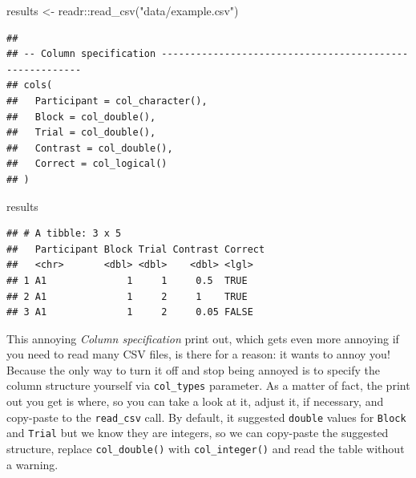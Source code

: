 \documentclass[
]{book}
\newenvironment{Shaded}{\begin{snugshade}}{\end{snugshade}}
\newcommand{\FunctionTok}[1]{\textcolor[rgb]{0.00,0.00,0.00}{#1}}
\newcommand{\NormalTok}[1]{#1}
\newcommand{\OtherTok}[1]{\textcolor[rgb]{0.56,0.35,0.01}{#1}}
\newcommand{\SpecialCharTok}[1]{\textcolor[rgb]{0.00,0.00,0.00}{#1}}
\newcommand{\StringTok}[1]{\textcolor[rgb]{0.31,0.60,0.02}{#1}}
\begin{document}
\begin{Shaded}
\begin{Highlighting}[]
\NormalTok{results }\OtherTok{\textless{}{-}}\NormalTok{ readr}\SpecialCharTok{::}\FunctionTok{read\_csv}\NormalTok{(}\StringTok{"data/example.csv"}\NormalTok{)}
\end{Highlighting}
\end{Shaded}

\begin{verbatim}
## 
## -- Column specification --------------------------------------------------------
## cols(
##   Participant = col_character(),
##   Block = col_double(),
##   Trial = col_double(),
##   Contrast = col_double(),
##   Correct = col_logical()
## )
\end{verbatim}

\begin{Shaded}
\begin{Highlighting}[]
\NormalTok{results}
\end{Highlighting}
\end{Shaded}

\begin{verbatim}
## # A tibble: 3 x 5
##   Participant Block Trial Contrast Correct
##   <chr>       <dbl> <dbl>    <dbl> <lgl>  
## 1 A1              1     1     0.5  TRUE   
## 2 A1              1     2     1    TRUE   
## 3 A1              1     2     0.05 FALSE
\end{verbatim}

This annoying \emph{Column specification} print out, which gets even more annoying if you need to read many CSV files, is there for a reason: it wants to annoy you! Because the only way to turn it off and stop being annoyed is to specify the column structure yourself via \texttt{col\_types} parameter. As a matter of fact, the print out you get is where, so you can take a look at it, adjust it, if necessary, and copy-paste to the \texttt{read\_csv} call. By default, it suggested \texttt{double} values for \texttt{Block} and \texttt{Trial} but we know they are integers, so we can copy-paste the suggested structure, replace \texttt{col\_double()} with \texttt{col\_integer()} and read the table without a warning.
\end{document}
